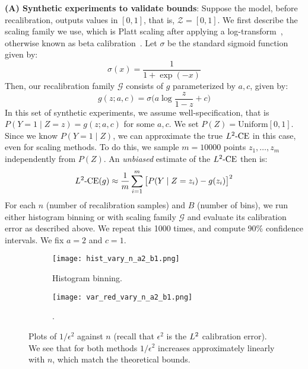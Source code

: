 \textbf{(A) Synthetic experiments to validate bounds}: Suppose the model, before recalibration, outputs values in $[0, 1]$, that is, $\mathcal{Z} = [0, 1]$. We first describe the scaling family we use, which is Platt scaling after applying a log-transform~\cite{platt1999probabilistic}, otherwise known as beta calibration~\cite{kull2017sigmoids}. Let $\sigma$ be the standard sigmoid function given by:
\[ \sigma(x) = \frac{1}{1 + \exp(-x)} \]
Then, our recalibration family $\mathcal{G}$ consists of $g$ parameterized by $a, c$, given by:
\[ g(z; a, c) = \sigma\Big( a\log{\frac{z}{1-z}} + c \Big) \]
In this set of synthetic experiments, we assume well-specification, that is $P(Y = 1 \mid Z=z) = g(z; a, c)$ for some $a, c$. We set $P(Z) = \mbox{Uniform}[0, 1]$. Since we know $P(Y = 1 \mid Z)$, we can approximate the true $L^2\textup{-CE}$ in this case, even for scaling methods. To do this, we sample $m=10000$ points $z_1, \dots, z_m$ independently from $P(Z)$. An \emph{unbiased} estimate of the $L^2\textup{-CE}$ then is:
\[ L^2\textup{-CE}(g) \approx \frac{1}{m} \sum_{i=1}^m \big[P(Y \mid Z = z_i) - g(z_i)\big]^2 \]
For each $n$ (number of recalibration samples) and $B$ (number of bins), we run either histogram binning or \ourcal{} with scaling family $\mathcal{G}$ and evaluate its calibration error as described above. We repeat this 1000 times, and compute 90\% confidence intervals. We fix $a = 2$ and $c = 1$.

\begin{figure}
  \centering
  \centering
     \begin{subfigure}[b]{0.48\textwidth}
         \centering
         \texttt{[image: hist\_vary\_n\_a2\_b1.png]}
         \caption{Histogram binning.
         }
         \label{fig:well-spec-vary-n-hist}
     \end{subfigure}
     \hfill
     \begin{subfigure}[b]{0.48\textwidth}
         \centering
         \texttt{[image: var\_red\_vary\_n\_a2\_b1.png]}
         \caption{\Ourcal{}.
         }
         \label{fig:well-spec-vary-n-var-red}
     \end{subfigure}
  \caption{
    Plots of $1/\epsilon^2$ against $n$ (recall that $\epsilon^2$ is the $L^2$ calibration error). We see that for both methods $1/\epsilon^2$ increases approximately linearly with $n$, which match the theoretical bounds.
}
  \label{fig:well-spec-vary-n}
\end{figure}

